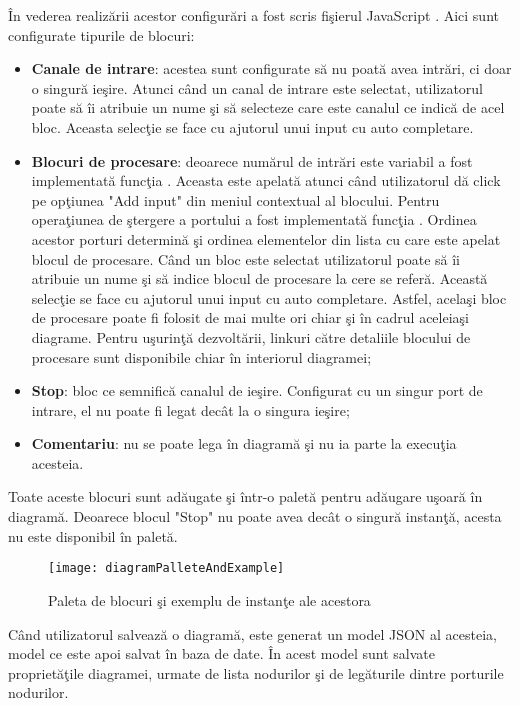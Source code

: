 În vederea realizării acestor configurări a fost scris fişierul JavaScript . Aici sunt configurate tipurile de blocuri:
\begin{itemize}
	\item \textbf{Canale de intrare}: acestea sunt configurate să nu poată avea intrări, ci doar o singură ieşire. Atunci când un canal de intrare este selectat, utilizatorul poate să îi atribuie un nume şi să selecteze care este canalul ce indică de acel bloc. Aceasta selecţie se face cu ajutorul unui input cu auto completare.
	\item \textbf{Blocuri de procesare}: deoarece numărul de intrări este variabil a fost implementată funcţia . Aceasta este apelată atunci când utilizatorul dă click pe opţiunea "Add input" din meniul contextual al blocului. Pentru operaţiunea de ştergere a portului a fost implementată funcţia . Ordinea acestor porturi determină şi ordinea elementelor din lista cu care este apelat blocul de procesare. Când un bloc este selectat utilizatorul poate să îi atribuie un nume şi să indice blocul de procesare la cere se referă. Această selecţie se face cu ajutorul unui input cu auto completare. Astfel, acelaşi bloc de procesare poate fi folosit de mai multe ori chiar şi în cadrul aceleiaşi diagrame. Pentru uşurinţă dezvoltării, linkuri către detaliile blocului de procesare sunt disponibile chiar în interiorul diagramei;
	\item \textbf{Stop}: bloc ce semnifică canalul de ieşire. Configurat cu un singur port de intrare, el nu poate fi legat decât la o singura ieşire;
	\item \textbf{Comentariu}: nu se poate lega în diagramă şi nu ia parte la execuţia acesteia. 
\end{itemize}
Toate aceste blocuri sunt adăugate şi într-o paletă pentru adăugare uşoară în diagramă. Deoarece blocul "Stop" nu poate avea decât o singură instanţă, acesta nu este disponibil în paletă.
\begin{figure}[H]
	\centering
	\texttt{[image: diagramPalleteAndExample]}
	\caption{Paleta de blocuri şi exemplu de instanţe ale acestora}
	\label{fig:diagramPalleteAndExample}
\end{figure}
Când utilizatorul salvează o diagramă, este generat un model JSON al acesteia, model ce este apoi salvat în baza de date. În acest model sunt salvate proprietăţile diagramei, urmate de lista nodurilor şi de legăturile dintre porturile nodurilor.

